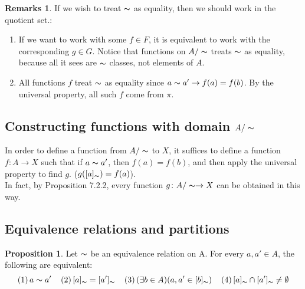 \documentclass[14pt]{article}
\theoremstyle{definition}
\newtheorem*{remark}{Remarks}
\newtheorem{proposition}[definition]{Proposition}
\begin{document}
\begin{remark}
If we wish to treat $\thicksim$ as equality, then we should work in the quotient set.:
\begin{enumerate}
    \item  If we want to work with some $f\in F$, it is equivalent to work with the corresponding $g\in G$. Notice that functions on $A/\thicksim$ treats $\thicksim$ as equality, because all it sees are $\thicksim$ classes, not elements of $A$.
    
    \item  All functions $f$  treat $\thicksim$ as equality since $a\thicksim a'\rightarrow f(a)=f(b) $. By the universal property, all such $f$ come from $\pi$.    
\end{enumerate}
\end{remark}

\vspace{5mm}

\subsection{Constructing functions with domain $A/\thicksim$}
In order to define a function from $A/\thicksim$ to $X$, it suffices to define a function $f\colon
 A\rightarrow X$ such that if $a\thicksim a'$, then $f(a)=f(b)$, and then apply the universal property to find $g$.
 ($g([a]_{\thicksim})=f(a)$).\\
 In fact, by Proposition 7.2.2, every function $g\colon A/\thicksim\rightarrow X$ can be obtained in this way.

 \vspace{5mm}


 \subsection{Equivalence relations and partitions}
 \begin{proposition}
    Let $\thicksim$ be an equivalence relation on A. For every $a, a'\in A$,  the following are equivalent:
    \begin{equation*}
    (1)\, a\thicksim a' \hspace{4mm} (2)\, [a]_{\thicksim}=[a']_{\thicksim} \hspace{4mm} 
    (3)\, (\exists b\in A)(a,a'\in[b]_{\thicksim})  \hspace{4mm} (4)\, [a]_{\thicksim}\cap [a']_{\thicksim}\not=\emptyset
    \end{equation*}
   
 \end{proposition}
 
\end{document}
